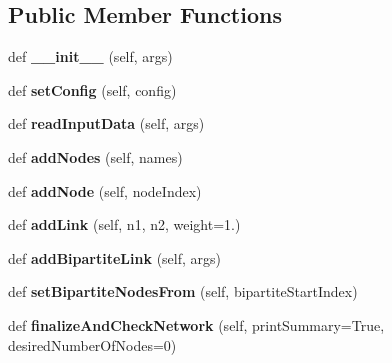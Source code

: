 \subsection*{Public Member Functions}
\begin{DoxyCompactItemize}
\item 
\mbox{\label{classinfomap_1_1Network_a0b73ca75b810d18618e2c6345675a437}} 
def {\bfseries \+\_\+\+\_\+init\+\_\+\+\_\+} (self, args)
\item 
\mbox{\label{classinfomap_1_1Network_aea7ba1ccd53116b9a094a47847101312}} 
def {\bfseries set\+Config} (self, config)
\item 
\mbox{\label{classinfomap_1_1Network_a1e2dd5825c16173f5b6e75f7ca9db5d4}} 
def {\bfseries read\+Input\+Data} (self, args)
\item 
\mbox{\label{classinfomap_1_1Network_ab4f8da47d3d1a13f7a7072e6a7893ca2}} 
def {\bfseries add\+Nodes} (self, names)
\item 
\mbox{\label{classinfomap_1_1Network_ab0098f1f3d50d31595086243d4b1a28e}} 
def {\bfseries add\+Node} (self, node\+Index)
\item 
\mbox{\label{classinfomap_1_1Network_a97e13e225c2855fc5503e73ad5528b14}} 
def {\bfseries add\+Link} (self, n1, n2, weight=1.)
\item 
\mbox{\label{classinfomap_1_1Network_ad677d2ed04b13c00a833b5ccde48a9b1}} 
def {\bfseries add\+Bipartite\+Link} (self, args)
\item 
\mbox{\label{classinfomap_1_1Network_aa806379883f0e3bb27686bb57f0fb9f4}} 
def {\bfseries set\+Bipartite\+Nodes\+From} (self, bipartite\+Start\+Index)
\item 
\mbox{\label{classinfomap_1_1Network_a34cc8c7628233c2e61e1ad35219b1cdd}} 
def {\bfseries finalize\+And\+Check\+Network} (self, print\+Summary=True, desired\+Number\+Of\+Nodes=0)
\item 
\mbox{\label{classinfomap_1_1Network_acbd294dfe8c3c1c76af3f0e2ee3106e1}} 

\end{DoxyCompactItemize}
